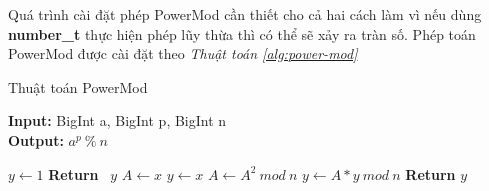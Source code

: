 Quá trình cài đặt phép PowerMod cần thiết cho cả hai cách làm vì nếu dùng \textbf{number\_t} thực hiện phép lũy thừa thì có thể sẽ xảy ra tràn số. 
Phép toán PowerMod được cài đặt theo \textit{Thuật toán \ref{alg:power-mod}}

\begin{algorithm}
\caption{Thuật toán PowerMod}\label{alg:power-mod}
\hspace*{\algorithmicindent} \textbf{Input:} BigInt a, BigInt p, BigInt n\\
\hspace*{\algorithmicindent} \textbf{Output:} $a^p\  \% \ n$ 
\begin{algorithmic}[1]
\State $y \gets 1$
\State \textbf{Return} \ $y$
\EndIf
\State $A \gets x$
\State $y \gets x$
\EndIf
{}
\State $A \gets A^2\ mod\ n$
\State $y \gets A*y \ mod \ n$
\EndIf
\EndFor
\State \textbf{Return } $y$
\EndProcedure
\end{algorithmic}
\end{algorithm}